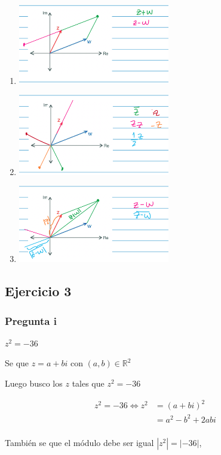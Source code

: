 \begin{enumerate}
    \item \includegraphics[width=250px]{6.2.1}
    \item \includegraphics[width=250px]{6.2.2}
    \item \includegraphics[width=250px]{6.2.3}
\end{enumerate}

\subsection{Ejercicio 3}

\subsubsection{Pregunta i}

$ z^2 = -36 $

Se que $ z = a+bi $ con $ (a,b) \in \mathbb{R}^2 $

Luego busco los $z$ tales que $z^2 = -36 $

\begin{align*}
    z^2 = -36 \iff z^2 &= (a+bi)^2 \\
    &= a^2 - b^2 + 2abi \\
\end{align*}

También se que el módulo debe ser igual $ |z^2| = |-36| $,

